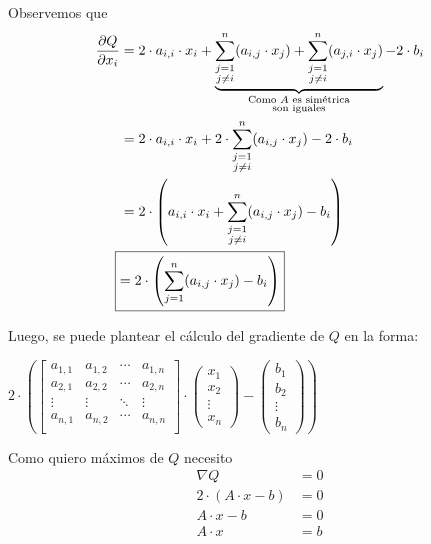 \documentclass[]{article}
\begin{document}
Observemos que
\begin{align*}
		\dfrac{\partial Q}{\partial x_i} &= 2\cdot a_{i,i}\cdot x_i + \underbrace{\sum_{\substack{j=1 \\ j\neq i}}^n (a_{i,j}\cdot x_j) + \sum_{\substack{j=1 \\ j\neq i}}^n (a_{j,i}\cdot x_j)}_{\dl{Como $A$ es simétrica}{son iguales}} - 2\cdot b_i\\
		&= 2\cdot a_{i,i}\cdot x_i + 2\cdot \sum_{\substack{j=1 \\ j\neq i}}^n (a_{i,j}\cdot x_j) - 2\cdot b_i\\
		&= 2\cdot \left(a_{i,i}\cdot x_i +\sum_{\substack{j=1 \\ j\neq i}}^n (a_{i,j}\cdot x_j) - b_i\right)\\
		\Aboxed{&= 2\cdot \left(\sum_{j=1}^n (a_{i,j}\cdot x_j) - b_i\right)}\\
\end{align*}

Luego, se puede plantear el cálculo del gradiente de $Q$ en la forma:

\begin{center}
	$2\cdot\left(\begin{bmatrix}
		a_{1,1} & a_{1,2} & \cdots & a_{1,n}\\
		a_{2,1} & a_{2,2} & \cdots & a_{2,n}\\
		\vdots & \vdots & \ddots & \vdots \\
		a_{n,1} & a_{n,2} & \cdots & a_{n,n}\\
	\end{bmatrix} \cdot \begin{pmatrix}
		x_1 \\ x_2 \\ \vdots \\ x_n
	\end{pmatrix} - \begin{pmatrix}
		b_1 \\ b_2 \\ \vdots \\ b_n
	\end{pmatrix}\right)$
\end{center}


Como quiero máximos de $Q$ necesito
\begin{align*}
	\nabla Q &= 0\\
	2\cdot (A\cdot x - b) &= 0\\
	A \cdot x - b &= 0\\
	A\cdot x &= b\\
\end{align*}
\end{document}
